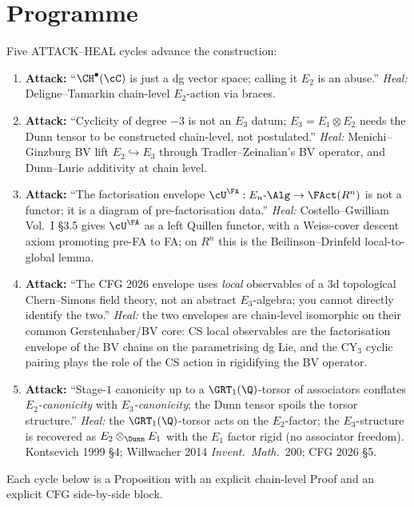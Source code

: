\section*{Programme}

Five ATTACK--HEAL cycles advance the construction:
\begin{enumerate}
\item[(A1)] \textbf{Attack:} ``$\CH^\bullet(\cC)$ is just a dg vector
space; calling it $E_2$ is an abuse.''
\emph{Heal:} Deligne--Tamarkin chain-level $E_2$-action via braces.
\item[(A2)] \textbf{Attack:} ``Cyclicity of degree $-3$ is not an $E_3$
datum; $E_3 = E_1\otimes E_2$ needs the Dunn tensor to be constructed
chain-level, not postulated.''
\emph{Heal:} Menichi--Ginzburg BV lift $E_2\hookrightarrow E_3$ through
Tradler--Zeinalian's BV operator, and Dunn--Lurie additivity at chain
level.
\item[(A3)] \textbf{Attack:} ``The factorisation envelope
$\cU^\FA:E_n\text{-}\Alg\to\FAct(R^n)$ is not a functor; it is a
diagram of pre-factorisation data.''
\emph{Heal:} Costello--Gwilliam Vol.~I \S 3.5 gives
$\cU^\FA$ as a left Quillen functor, with a Weiss-cover descent axiom
promoting pre-FA to FA; on $R^n$ this is the Beilinson--Drinfeld
local-to-global lemma.
\item[(A4)] \textbf{Attack:} ``The CFG 2026 envelope uses \emph{local}
observables of a $3$d topological Chern--Simons field theory, not an
abstract $E_3$-algebra; you cannot directly identify the two.''
\emph{Heal:} the two envelopes are chain-level isomorphic on their
common Gerstenhaber/BV core: CS local observables are the
factorisation envelope of the BV chains on the parametrising dg Lie,
and the CY$_3$ cyclic pairing plays the role of the CS action in
rigidifying the BV operator.
\item[(A5)] \textbf{Attack:} ``Stage-$1$ canonicity up to a
$\GRT_1(\Q)$-torsor of associators conflates \emph{$E_2$-canonicity}
with \emph{$E_3$-canonicity}; the Dunn tensor spoils the torsor
structure.''
\emph{Heal:} the $\GRT_1(\Q)$-torsor acts on the $E_2$-factor; the
$E_3$-structure is recovered as $E_2\otimes_{\Dunn}E_1$ with the $E_1$
factor rigid (no associator freedom). Kontsevich 1999 \S 4; Willwacher
2014 \emph{Invent.\ Math.}\ 200; CFG 2026 \S 5.
\end{enumerate}

Each cycle below is a Proposition with an explicit chain-level Proof
and an explicit CFG side-by-side block.


